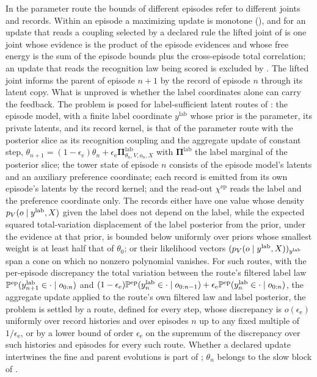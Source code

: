 In the parameter route the bounds of different episodes refer to different joints and
records. Within an episode a maximizing update is monotone
(), and for an update that reads a coupling
selected by a declared rule the lifted joint of
 is one joint whose evidence is the product
of the episode evidences and whose free energy is the sum of the episode bounds plus
the cross-episode total correlation; an update that reads the recognition law being
scored is excluded by . The lifted joint informs the
parent of episode $n+1$ by the record of episode $n$ through its latent copy. What is
unproved is whether the label coordinates alone can carry the feedback. The problem is
posed for label-sufficient latent routes of : the
episode model, with a finite label coordinate $y^{\mathrm{lab}}$ whose prior is the
parameter, its private latents, and its record kernel, is that of the parameter route
with the posterior slice as its recognition coupling and the aggregate update of
constant step,
$\theta_{n+1}=(1-\epsilon_{\mathrm e})\theta_n+\epsilon_{\mathrm e}\boldsymbol\Pi^{\mathrm{lab}}_{\theta_n,V,o_n,X}$
with $\boldsymbol\Pi^{\mathrm{lab}}$ the label marginal of the posterior slice; the
tower state of episode $n$ consists of the episode model's latents and an auxiliary
preference coordinate; each record is emitted from its own episode's latents by the
record kernel; and the read-out $\chi^{\mathrm{ep}}$ reads the label and the
preference coordinate only. The records either have one value whose density
$p_V(o\mid y^{\mathrm{lab}},X)$ given the label does not depend on the label, while
the expected squared total-variation displacement of the label posterior from the
prior, under the evidence at that prior, is bounded below uniformly over priors whose
smallest weight is at least half that of $\theta_0$; or their likelihood vectors
$(p_V(o\mid y^{\mathrm{lab}},X))_{y^{\mathrm{lab}}}$ span a cone on which no nonzero
polynomial vanishes. For such routes, with the per-episode discrepancy the total
variation between the route's filtered label law
$\mathbb P^{\mathrm{ep}}(y^{\mathrm{lab}}_{n+1}\in\cdot\mid o_{0:n})$ and
$(1-\epsilon_{\mathrm e})\mathbb P^{\mathrm{ep}}(y^{\mathrm{lab}}_{n}\in\cdot\mid o_{0:n-1})
+\epsilon_{\mathrm e}\mathbb P^{\mathrm{ep}}(y^{\mathrm{lab}}_{n}\in\cdot\mid o_{0:n})$,
the aggregate update applied to the route's own filtered law and label posterior, the
problem is settled by a route, defined for every step, whose discrepancy is
$o(\epsilon_{\mathrm e})$ uniformly over record histories and over episodes $n$ up to
any fixed multiple of $1/\epsilon_{\mathrm e}$, or by a lower bound of order
$\epsilon_{\mathrm e}$ on the supremum of the discrepancy over such histories and
episodes for every such route. Whether a declared update intertwines the fine and
parent evolutions is part of ; $\theta_n$
belongs to the slow block of .

